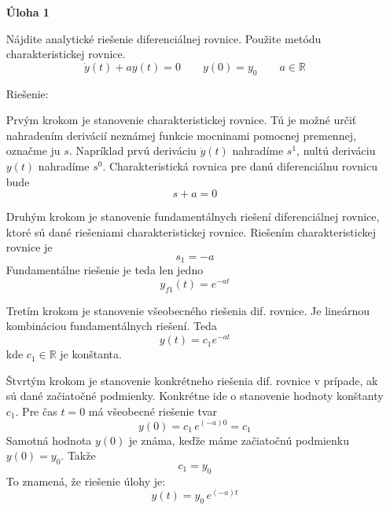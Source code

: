 \documentclass[a4paper, 10pt, ]{article}
\begin{document}
\noindent
\begin{itemize}[leftmargin=0pt, labelsep=3mm, itemsep=0pt]

	\item[\textsf{\bfseries Úloha 1}] {\sffamily%
    Nájdite analytické riešenie diferenciálnej rovnice. Použite metódu charakteristickej rovnice.
	\begin{equation*} 
        \dot y(t) + a y(t) = 0  \qquad y(0) = y_0 \qquad a \in \mathbb{R}
    \end{equation*}
    
    Riešenie:}

    Prvým krokom je stanovenie charakteristickej rovnice. Tú je možné určiť nahradením derivácií neznámej funkcie mocninami pomocnej premennej, označme ju $s$. Napríklad prvú deriváciu $\dot y(t)$ nahradíme $s^1$, nultú deriváciu $y(t)$ nahradíme $s^0$. Charakteristická rovnica pre danú diferenciálnu rovnicu bude
    \begin{equation}
        s + a = 0
    \end{equation}

    Druhým krokom je stanovenie fundamentálnych riešení diferenciálnej rovnice, ktoré sú dané riešeniami charakteristickej rovnice. Riešením charakteristickej rovnice je 
    \begin{equation}
        s_1 = -a
    \end{equation}
    Fundamentálne riešenie je teda len jedno
    \begin{equation}
        y_{f1}(t) = e^{-at}
    \end{equation}

    Tretím krokom je stanovenie všeobecného riešenia dif. rovnice. Je lineárnou kombináciou fundamentálnych riešení. Teda
    \begin{equation}
        y(t) = c_1 e^{-at}
    \end{equation}
    kde $c_1 \in \mathbb{R}$ je konštanta. 
    
    Štvrtým krokom je stanovenie konkrétneho riešenia dif. rovnice v prípade, ak sú dané začiatočné podmienky. Konkrétne ide o stanovenie hodnoty konštanty $c_1$. Pre čas $t = 0$ má všeobecné riešenie tvar
    \begin{equation}
        y(0)  = c_1 \, e^{(-a) 0} = c_1
    \end{equation}
    Samotná hodnota $y(0)$ je známa, keďže máme začiatočnú podmienku $y(0) = y_0$. Takže
    \begin{equation}
        c_1 = y_0
    \end{equation}
    To znamená, že riešenie úlohy je:
    \begin{equation}
        y(t)  = y_0 \, e^{(-a) t}
    \end{equation}


\end{itemize}
\end{document}
